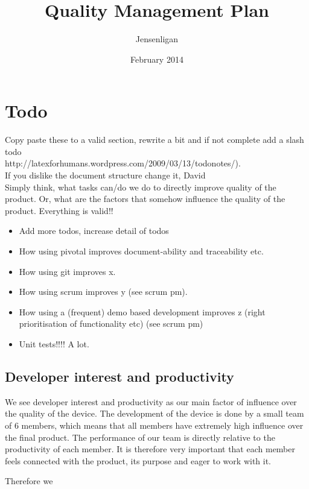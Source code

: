 \documentclass{article}
\title{Quality Management Plan}
\author{Jensenligan}
\date{February 2014}
\begin{document}
\maketitle

\section{Todo}


Copy paste these to a valid section, rewrite a bit and if not complete add a slash todo \\
http://latexforhumans.wordpress.com/2009/03/13/todonotes/).\\If you dislike the document structure change it, David
\\
Simply think, what tasks can/do we do to directly improve quality of the product. Or, what are the factors that somehow influence the quality of the product. Everything is valid!!
\begin{itemize}
\item Add more todos, increase detail of todos
\item How using pivotal improves document-ability and traceability etc.
\item How using git improves x.
\item How using scrum improves y (see scrum pm).
\item How using a (frequent) demo based development improves z (right prioritisation of functionality etc) (see scrum pm)
\item Unit tests!!!! A lot.
\end{itemize}


\subsection{Developer interest and productivity}
We see developer interest and productivity as our main factor of influence over the quality of the device. The development of the device is done by a small team of 6 members, which means that all members have extremely high influence over the final product. The performance of our team is directly relative to the productivity of each member. It is therefore very important that each member feels connected with the product, its purpose and eager to work with it. 

Therefore we 
\end{document}
